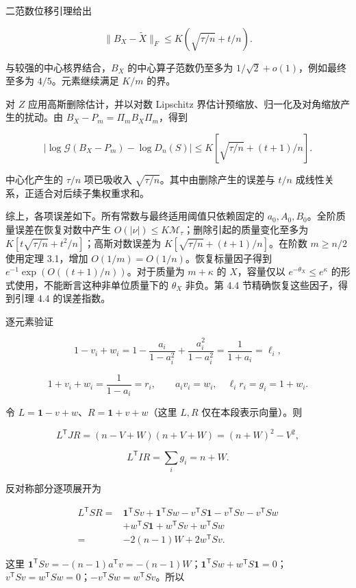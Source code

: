 \documentclass[11pt,a4paper]{article}
\begin{document}
二范数位移引理给出

\[\|B_X-\widetilde X\|_F\le K(\sqrt{\tau/n}+t/n).\]

与较强的中心核界结合，\(B_X\) 的中心算子范数仍至多为 \(1/\sqrt2+o(1)\)，例如最终至多为 \(4/5\)。元素继续满足 \(K/m\) 的界。

对 \(Z\) 应用高斯删除估计，并以对数 Lipschitz 界估计预缩放、归一化及对角缩放产生的扰动。由 \(B_X-P_m=\Pi_mB_X\Pi_m\)，得到

\[|\log\mathcal G(B_X-P_m)-\log D_n(S)|\le K\left[\sqrt{\tau/n}+(t+1)/n\right].\]

中心化产生的 \(\tau/n\) 项已吸收入 \(\sqrt{\tau/n}\)。其中由删除产生的误差与 \(t/n\) 成线性关系，正适合对后续子集权重求和。

综上，各项误差如下。所有常数与最终适用阈值只依赖固定的 \(a_0,A_0,B_0\)。全阶质量误差在恢复对数中产生 \(O(|\nu|)\le K\mathcal M_\tau\)；删除引起的质量变化至多为 \(K[t\sqrt{\tau/n}+t^2/n]\)；高斯对数误差为 \(K[\sqrt{\tau/n}+(t+1)/n]\)。在阶数 \(m\ge n/2\) 使用定理 3.1，增加 \(O(1/m)=O(1/n)\)。恢复标量因子得到 \(e^{-1}\exp(O((t+1)/n))\)。对于质量为 \(m+\kappa\) 的 \(X\)，容量仅以 \(e^{-\theta_X}\le e^\kappa\) 的形式使用，不能断言这种非单位质量下的 \(\theta_X\) 非负。第 4.4 节精确恢复这些因子，得到引理 4.4 的误差指数。

逐元素验证

\[1-v_i+w_i=1-\frac{a_i}{1-a_i^2}+\frac{a_i^2}{1-a_i^2}
=\frac1{1+a_i}=\ell_i,\]

\[1+v_i+w_i=\frac1{1-a_i}=r_i,\qquad
a_iv_i=w_i,\quad \ell_ir_i=g_i=1+w_i.\]

令 \(L=\mathbf1-v+w\)、\(R=\mathbf1+v+w\)（这里 \(L,R\) 仅在本段表示向量）。则

\[L^{\mathsf T}JR=(n-V+W)(n+V+W)=(n+W)^2-V^2,\]

\[L^{\mathsf T}IR=\sum_i g_i=n+W.\]

反对称部分逐项展开为

\[\begin{aligned}
L^{\mathsf T}SR
={}&\mathbf1^{\mathsf T}Sv+\mathbf1^{\mathsf T}Sw
-v^{\mathsf T}S\mathbf1-v^{\mathsf T}Sv-v^{\mathsf T}Sw\\
&+w^{\mathsf T}S\mathbf1+w^{\mathsf T}Sv+w^{\mathsf T}Sw\\
={}&-2(n-1)W+2w^{\mathsf T}Sv.
\end{aligned}\]

这里 \(\mathbf1^{\mathsf T}Sv=-(n-1)a^{\mathsf T}v=-(n-1)W\)；\(\mathbf1^{\mathsf T}Sw+w^{\mathsf T}S\mathbf1=0\)；\(v^{\mathsf T}Sv=w^{\mathsf T}Sw=0\)；\(-v^{\mathsf T}Sw=w^{\mathsf T}Sv\)。所以
\end{document}
